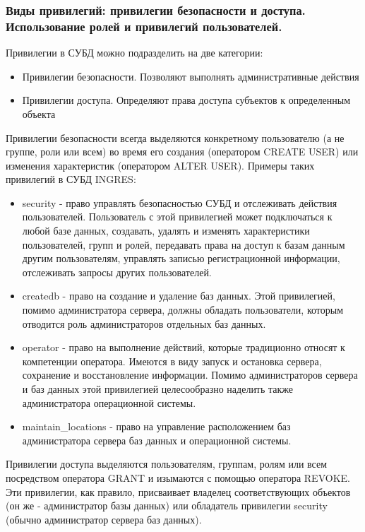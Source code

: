\subsubsection{Виды привилегий: привилегии безопасности и доступа. Использование ролей и привилегий пользователей.}

Привилегии в СУБД можно подразделить на две категории:
\begin{itemize}
    \item Привилегии безопасности. Позволяют выполнять административные действия
    \item Привилегии доступа. Определяют права доступа субъектов к определенным объекта
\end{itemize}

Привилегии безопасности всегда выделяются конкретному пользователю (а не группе, роли или всем) во
время его создания (оператором CREATE USER) или изменения характеристик (оператором ALTER USER).
Примеры таких привилегий в СУБД INGRES:
\begin{itemize}
    \item security - право управлять безопасностью СУБД и отслеживать действия
        пользователей. Пользователь с этой привилегией может подключаться к любой базе
        данных, создавать, удалять и изменять характеристики пользователей, групп и ролей,
        передавать права на доступ к базам данным другим пользователям, управлять
        записью регистрационной информации, отслеживать запросы других пользователей.
    \item createdb - право на создание и удаление баз данных. Этой привилегией,
        помимо администратора сервера, должны обладать пользователи, которым отводится
        роль администраторов отдельных баз данных.
    \item operator - право на выполнение действий, которые традиционно относят к
        компетенции оператора. Имеются в виду запуск и остановка сервера, сохранение и
        восстановление информации. Помимо администраторов сервера и баз данных этой
        привилегией целесообразно наделить также администратора операционной системы.
    \item maintain\_locations - право на управление расположением баз администратора
        сервера баз данных и операционной системы.
\end{itemize}

Привилегии доступа выделяются пользователям, группам, ролям или всем посредством оператора GRANT и
изымаются с помощью оператора REVOKE. Эти привилегии, как правило, присваивает владелец
соответствующих объектов (он же - администратор базы данных) или обладатель привилегии security
(обычно администратор сервера баз данных).

